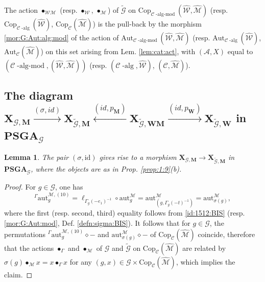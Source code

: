\documentclass[10pt]{amsart}
\newtheorem{lem}[thm]{Lemma}
\numberwithin{equation}{subsection}
\begin{document}
\begin{defn}\label{def:35:1009}
The action $\bullet_{\mathcal{WM}}$ (resp. $\bullet_{\mathcal{W}}$, $\bullet_{\mathcal{M}}$) of $\tilde{\mathcal G}$ on 
$\mathrm{Cop}_{\mathcal C\operatorname{-alg-mod}}(\hat{\mathcal W},\hat{\mathcal M})$ 
(resp. $\mathrm{Cop}_{\mathcal C\operatorname{-alg}}(\hat{\mathcal W})$, $\mathrm{Cop}_{\mathcal C}(\hat{\mathcal M})$)
is the pull-back by the morphism  
\eqref{mor:G:Aut:alg:mod} of the action of 
$\mathrm{Aut}_{\mathcal C\operatorname{-alg-mod}}(\hat{\mathcal W},\hat{\mathcal M})$ (resp. 
$\mathrm{Aut}_{\mathcal C\operatorname{-alg}}(\hat{\mathcal W})$, $\mathrm{Aut}_{\mathcal C}(\hat{\mathcal M})$) on this set arising from Lem. 
\ref{lem:cat:act}, with $(\mathcal A,X)$ equal to $(\mathcal C\operatorname{-alg-mod},(\hat{\mathcal W},\hat{\mathcal M}))$
(resp. $(\mathcal C\operatorname{-alg},\hat{\mathcal W})$, $(\mathcal C,\hat{\mathcal M})$). 
\end{defn}

\subsection{The diagram $\mathbf X_{\mathcal G,\mathbf M}\stackrel{(\sigma,id)}{\to}
\mathbf X_{\tilde{\mathcal G},\mathbf M}\stackrel{(id,p_{\mathbf M})}{\leftarrow}\mathbf X_{\tilde{\mathcal G},\mathbf{WM}}\stackrel{(id,p_{\mathbf W})}{\to}
\mathbf X_{\tilde{\mathcal G},\mathbf{W}}$ in $\mathbf{PSGA}_{\mathcal G}$}\label{sect:XXXX}

\begin{lem}\label{lem:mor:A'':A:BIS}
The pair $(\sigma,\mathrm{id})$ gives rise to a morphism 
$\mathbf X_{\mathcal G,\mathbf M}\to 
\mathbf X_{\tilde{\mathcal G},\mathbf M}$ in $\mathbf{PSGA}_{\mathcal G}$, where the objects are as in Prop. \ref{prop:1:9}(b).  
\end{lem}

\begin{proof}
For $g\in\mathcal G$, one has 
$$
 ^\Gamma\mathrm{aut}_g^{\mathcal M,(10)}
=\ell_{\Gamma_g(-e_1)^{-1}}\circ \mathrm{aut}_g^{\mathcal M}
=\mathrm{aut}_{(g,\Gamma_g(-t)^{-1})}^{\mathcal M}
=\mathrm{aut}_{\sigma(g)}^{\mathcal M}, 
$$
where the first (resp. second, third) equality follows from \eqref{id:1512:BIS} (resp. 
\eqref{mor:G:Aut:mod}, Def. \ref{defn:sigma:BIS}). 
It follows that for $g\in\mathcal G$, the permutations 
$^\Gamma\mathrm{aut}_g^{\mathcal M,(10)}\diamond-$ and $\mathrm{aut}_{\sigma(g)}^{\mathcal M}\diamond-$
of $\mathrm{Cop}_{\mathcal C}(\hat{\mathcal M})$ coincide, therefore that 
the actions $\bullet_\Gamma$ and $\bullet_{\mathcal M}$ of $\mathcal G$ and $\tilde{\mathcal G}$ 
on $\mathrm{Cop}_{\mathcal C}(\hat{\mathcal M})$ are related by 
$\sigma(g)\bullet_{\mathcal M}x=x\bullet_{\Gamma}x$ for any $(g,x)\in \mathcal G\times 
\mathrm{Cop}_{\mathcal C}(\hat{\mathcal M})$, which implies the claim. 
\end{proof}
\end{document}
